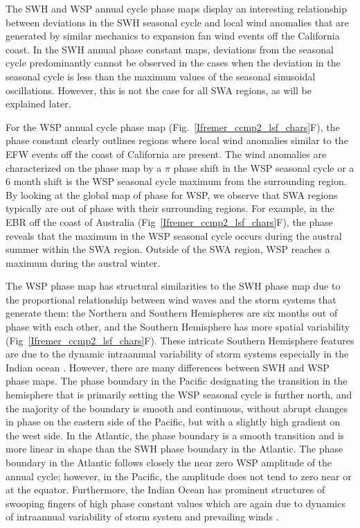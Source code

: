 \documentclass[12pt,twoside]{article}
\begin{document}
The SWH and WSP annual cycle phase maps display an interesting relationship between deviations in the SWH seasonal cycle and local wind anomalies that are generated by similar mechanics to expansion fan wind events off the California coast. In the SWH annual phase constant maps, deviations from the seasonal cycle predominantly cannot be observed in the cases when the deviation in the seasonal cycle is less than the maximum values of the seasonal sinusoidal oscillations. However, this is not the case for all SWA regions, as will be explained later.  

For the WSP annual cycle phase map (Fig.~\ref{Ifremer_ccmp2_lsf_chars}F), the phase constant clearly outlines regions where local wind anomalies similar to the EFW events off the coast of California are present. The wind anomalies are characterized on the phase map by a $\pi$ phase shift in the WSP seasonal cycle or a 6 month shift is the WSP seasonal cycle maximum from the surrounding region. By looking at the global map of phase for WSP, we observe that SWA regions typically are out of phase with their surrounding regions. For example, in the EBR off the coast of Australia (Fig~\ref{Ifremer_ccmp2_lsf_chars}F), the phase reveals that the maximum in the WSP seasonal cycle occurs during the austral summer within the SWA region. Outside of the SWA region, WSP reaches a maximum during the austral winter. 

The WSP phase map has structural similarities to the SWH phase map due to the proportional relationship between wind waves and the storm systems that generate them: the Northern and Southern Hemispheres are six months out of phase with each other, and the Southern Hemisphere has more spatial variability (Fig~\ref{Ifremer_ccmp2_lsf_chars}F). These intricate Southern Hemisphere features are due to the dynamic intraannual variability of storm systems especially in the Indian ocean \cite{schott2009indian}. However, there are many differences between SWH and WSP phase maps. The phase boundary in the Pacific designating the transition in the hemisphere that is primarily setting the WSP seasonal cycle is further north, and the majority of the boundary is smooth and continuous, without abrupt changes in phase on the eastern side of the Pacific, but with a slightly high gradient on the west side. In the Atlantic, the phase boundary is a smooth transition and is more linear in shape than the SWH phase boundary in the Atlantic. The phase boundary in the Atlantic follows closely the near zero WSP amplitude of the annual cycle; however, in the Pacific, the amplitude does not tend to zero near or at the equator. Furthermore, the Indian Ocean has prominent structures of swooping fingers of high phase constant values which are again due to dynamics of intraannual variability of storm system and prevailing winds \cite{schott2009indian}. 
\end{document}
